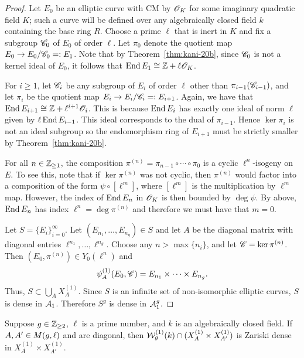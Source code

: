 \documentclass{amsart}
\begin{document}
\begin{proof}
 Let $E_0$ be an elliptic curve with CM by $\mathscr{O}_K$ for some imaginary quadratic field $K$; such a curve will be defined over any algebraically closed field $k$ containing the base ring $R$. Choose a prime $\ell$ that is inert in $K$ and fix a subgroup $\mathscr{C}_0$ of $E_0$ of order $\ell$. Let $\pi_0$ denote the quotient map $E_0 \to E_0/\mathscr{C}_0 =: E_1$. Note that by Theorem~\ref{thm:kani-20b}, since $\mathscr{C}_0$ is not a kernel ideal of $E_0$, it follows that $\operatorname{End} E_1 \cong \mathbb{Z} + \ell\mathscr{O}_K$.

 For $i \ge 1$, let $\mathscr{C}_i$ be any subgroup of $E_i$ of order $\ell$ other than $\pi_{i-1}(\mathscr{C}_{i-1})$, and let $\pi_i$ be the quotient map $E_i \to E_i/\mathscr{C}_i =: E_{i+1}$. Again, we have that $\operatorname{End} E_{i+1} \cong \mathbb{Z} + \ell^{i+1}\mathscr{O}_{i}$. This is because $\operatorname{End} E_{i}$ has exactly one ideal of norm $\ell$ given by $\ell\operatorname{End} E_{i-1}$. This ideal corresponds to the dual of $\pi_{i-1}$. Hence $\ker\pi_i$ is not an ideal subgroup so the endomorphism ring of $E_{i+1}$ must be strictly smaller by Theorem~\ref{thm:kani-20b}.

 For all $n \in \mathbb{Z}_{\ge 1}$, the composition $\pi^{(n)} = \pi_{n-1} \circ \cdots \circ \pi_0$ is a cyclic $\ell^n$-isogeny on $E$. To see this, note that if $\ker\pi^{(n)}$ was not cyclic, then $\pi^{(n)}$ would factor into a composition of the form $\psi\circ[\ell^m]$, where $[\ell^m]$ is the multiplication by $\ell^m$ map. However, the index of $\operatorname{End} E_n$ in $\mathscr{O}_K$ is then bounded by $\deg\psi$. By above, $\operatorname{End} E_n$ has index $\ell^n = \deg\pi^{(n)}$ and therefore we must have that $m = 0$.

 Let $S = \{E_i\}_{i=0}^\infty$. Let $(E_{n_1},\dots,E_{n_g}) \in S$ and let $A$ be the diagonal matrix with diagonal entries $\ell^{n_1},\dots,\ell^{n_g}$.  Choose any $n > \max\{n_i\}$, and let $\mathscr{C} = \ker \pi^{(n)}$. Then $(E_0,\pi^{(n)}) \in Y_0(\ell^n)$ and
 \[
   \psi_{A}^{(1)}(E_0,\mathscr{C}) = E_{n_1} \times \cdots \times E_{n_g}.
 \]
Thus, $S \subset \bigcup_A X^{(1)}_A$. Since $S$ is an infinite set of non-isomorphic elliptic curves, $S$ is dense in $\mathcal{A}_1$. Therefore $S^g$ is dense in $\mathcal{A}_1^g$.
\end{proof}

\begin{theorem}\label{thm:Sg-dense-a1}
  Suppose $g\in\mathbb{Z}_{\ge 2}$, $\ell$ is a prime number, and $k$ is an algebraically closed field. If $A,A' \in M(g,\ell)$ and are diagonal, then $\mathcal{W}_g^{(1)}(k) \cap (X^{(1)}_A \times X^{(1)}_{A'})$ is Zariski dense in $X^{(1)}_A \times X^{(1)}_{A'}$.
\end{theorem}
\end{document}
